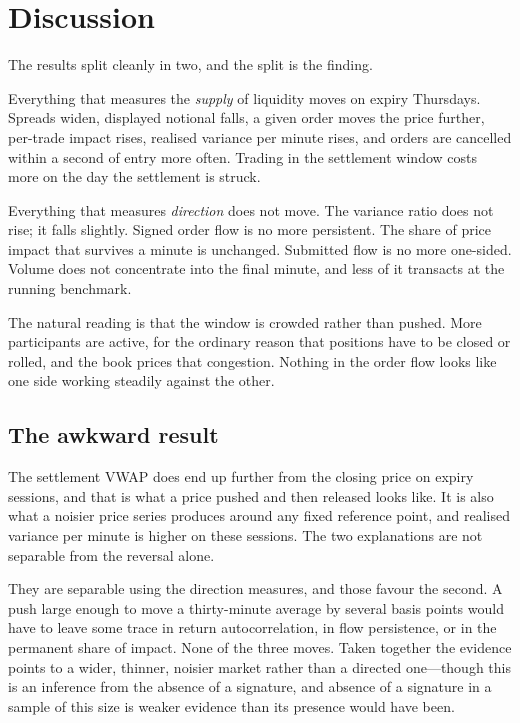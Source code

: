 \section{Discussion}\label{sec:discussion}

The results split cleanly in two, and the split is the finding.

Everything that measures the \emph{supply} of liquidity moves on expiry Thursdays. Spreads
widen, displayed notional falls, a given order moves the price further, per-trade impact
rises, realised variance per minute rises, and orders are cancelled within a second of entry
more often. Trading in the settlement window costs more on the day the settlement is struck.

Everything that measures \emph{direction} does not move. The variance ratio does not rise;
it falls slightly. Signed order flow is no more persistent. The share of price impact that
survives a minute is unchanged. Submitted flow is no more one-sided. Volume does not
concentrate into the final minute, and less of it transacts at the running benchmark.

The natural reading is that the window is crowded rather than pushed. More participants are
active, for the ordinary reason that positions have to be closed or rolled, and the book
prices that congestion. Nothing in the order flow looks like one side working steadily
against the other.

\subsection{The awkward result}

The settlement VWAP does end up further from the closing price on expiry sessions, and that
is what a price pushed and then released looks like. It is also what a noisier price series
produces around any fixed reference point, and realised variance per minute is higher on
these sessions. The two explanations are not separable from the reversal alone.

They are separable using the direction measures, and those favour the second. A push large
enough to move a thirty-minute average by several basis points would have to leave some trace
in return autocorrelation, in flow persistence, or in the permanent share of impact. None of
the three moves. Taken together the evidence points to a wider, thinner, noisier market
rather than a directed one---though this is an inference from the absence of a signature, and
absence of a signature in a sample of this size is weaker evidence than its presence would
have been.

